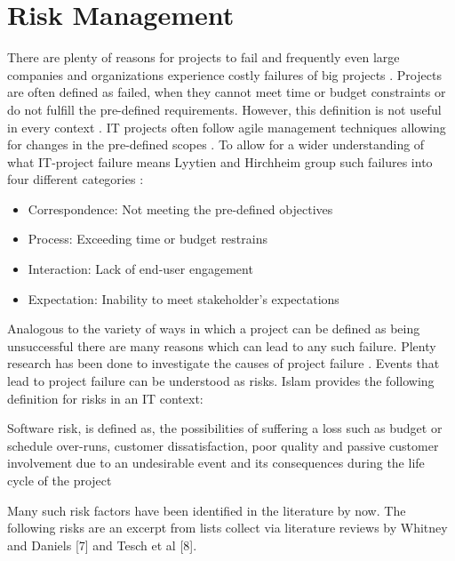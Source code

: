\section{Risk Management}
\label{sec:theoryA}

There are plenty of reasons for projects to fail and frequently even large companies and organizations experience costly failures of big projects \cite{dwivediResearchInformationSystems2015}. Projects are often defined as failed, when they cannot meet time or budget constraints or do not fulfill the pre-defined requirements. However, this definition is not useful in every context \cite{debakkerDoesRiskManagement2010}. IT projects often follow agile management techniques allowing for changes in the pre-defined scopes \cite{kusay-merkleAgilesProjektmanagementIm2018}. To allow for a wider understanding of what IT-project failure means Lyytien and Hirchheim group such failures into four different categories \cite{lyytinenInformationSystemsFailures1988}: 
\begin{itemize}
	\item Correspondence: Not meeting the pre-defined objectives
	\item Process: Exceeding time or budget restrains
	\item Interaction: Lack of end-user engagement
	\item Expectation: Inability to meet stakeholder's expectations
\end{itemize}	
Analogous to the variety of ways in which a project can be defined as being unsuccessful there are many reasons which can lead to any such failure. Plenty research has been done to investigate the causes of project failure \cite{guptaSystematicLiteratureReview2018}.  Events that lead to project failure can be understood as risks. Islam \cite{islamSoftwareDevelopmentRisk2011} provides the following definition for risks in an IT context:
\begin{fquote}
	Software risk, is defined as, the possibilities of suffering a loss such as budget or schedule over-runs, customer dissatisfaction, poor quality and passive customer involvement due to an undesirable event and its consequences during the life cycle of the project
\end{fquote}
Many such risk factors have been identified in the literature by now. The following risks are an excerpt from lists collect via literature reviews by Whitney and Daniels [7] and Tesch et al [8]. 

